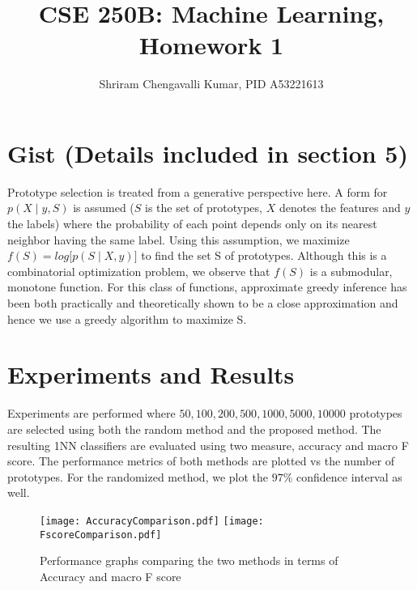 \documentclass[11pt]{article}
\title{\textbf{CSE 250B: Machine Learning, Homework 1}}
\author{Shriram Chengavalli Kumar, PID A53221613}
\begin{document}
\maketitle

\newtheorem{theorem}{Theorem}[section]
\newtheorem{corollary}{Corollary}[theorem]
\newtheorem{lemma}[theorem]{Lemma}


\section{Gist (Details included in section 5)}
Prototype selection is treated from a generative perspective here. A form for $p(X \mid y,S)$ is assumed ($S$ is the set of prototypes, $X$ denotes the features and $y$ the labels) where the probability of each point depends only on its nearest neighbor having the same label. Using this assumption, we maximize $f(S) = log\big\lbrack p(S \mid X,y) \big\rbrack$ to find the set S of prototypes. Although this is a combinatorial optimization problem, we observe that $f(S)$ is a submodular, monotone function. For this class of functions, approximate greedy inference has been both practically and theoretically shown to be a close approximation and hence we use a greedy algorithm to maximize S.

\section{Experiments and Results}
Experiments are performed where $50,100,200,500,1000,5000,10000$ prototypes are selected using both the random method and the proposed method. The resulting 1NN classifiers are evaluated using two measure, accuracy and macro F score. The performance metrics of both methods are plotted vs the number of prototypes. For the randomized method, we plot the $97\%$ confidence interval as well. \\

\begin{figure}
\texttt{[image: AccuracyComparison.pdf]}
\texttt{[image: FscoreComparison.pdf]}
  
\caption{Performance graphs comparing the two methods in terms of Accuracy and macro F score}
\label{fig:performanceGraphs}
\end{figure}
\end{document}
